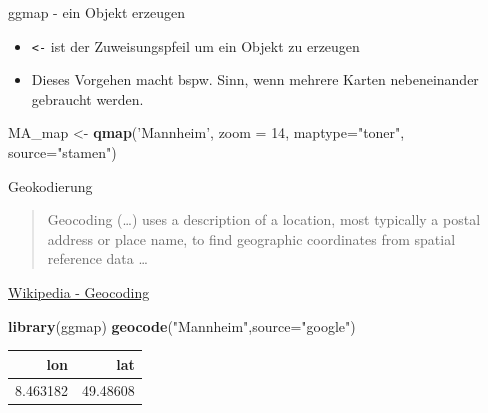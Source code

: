 \documentclass[ignorenonframetext,]{beamer}
\newenvironment{Shaded}{}{}
\newcommand{\KeywordTok}[1]{\textcolor[rgb]{0.00,0.44,0.13}{\textbf{{#1}}}}
\newcommand{\DataTypeTok}[1]{\textcolor[rgb]{0.56,0.13,0.00}{{#1}}}
\newcommand{\DecValTok}[1]{\textcolor[rgb]{0.25,0.63,0.44}{{#1}}}
\newcommand{\StringTok}[1]{\textcolor[rgb]{0.25,0.44,0.63}{{#1}}}
\newcommand{\NormalTok}[1]{{#1}}
\providecommand{\tightlist}{%
\setlength{\itemsep}{0pt}\setlength{\parskip}{0pt}}
\begin{document}
\begin{frame}[fragile]{ggmap - ein Objekt erzeugen}

\begin{itemize}
\tightlist
\item
  \texttt{\textless{}-} ist der Zuweisungspfeil um ein Objekt zu
  erzeugen
\item
  Dieses Vorgehen macht bspw. Sinn, wenn mehrere Karten nebeneinander
  gebraucht werden.
\end{itemize}

\begin{Shaded}
\begin{Highlighting}[]
\NormalTok{MA_map <-}\StringTok{ }\KeywordTok{qmap}\NormalTok{(}\StringTok{'Mannheim'}\NormalTok{, }
               \DataTypeTok{zoom =} \DecValTok{14}\NormalTok{,}
               \DataTypeTok{maptype=}\StringTok{"toner"}\NormalTok{,}
               \DataTypeTok{source=}\StringTok{"stamen"}\NormalTok{)}
\end{Highlighting}
\end{Shaded}

\end{frame}

\begin{frame}[fragile]{Geokodierung}

\begin{quote}
Geocoding (\ldots{}) uses a description of a location, most typically a
postal address or place name, to find geographic coordinates from
spatial reference data \ldots{}
\end{quote}

\href{https://github.com/adam-p/markdown-here/wiki/Markdown-Cheatsheet\#blockquotes}{Wikipedia
- Geocoding}

\begin{Shaded}
\begin{Highlighting}[]
\KeywordTok{library}\NormalTok{(ggmap)}
\KeywordTok{geocode}\NormalTok{(}\StringTok{"Mannheim"}\NormalTok{,}\DataTypeTok{source=}\StringTok{"google"}\NormalTok{)}
\end{Highlighting}
\end{Shaded}

\begin{longtable}[]{@{}rr@{}}
\toprule
lon & lat\tabularnewline
\midrule
\endhead
8.463182 & 49.48608\tabularnewline
\bottomrule
\end{longtable}

\end{frame}
\end{document}
